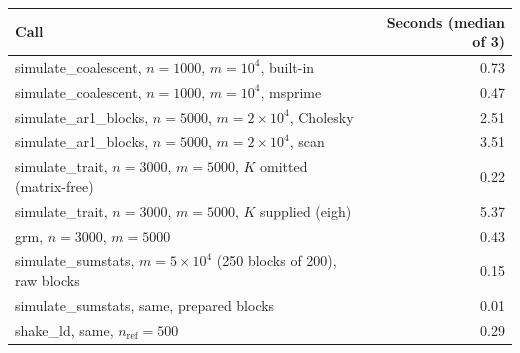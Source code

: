 \begin{tabular}{lr}
\toprule
Call & Seconds (median of 3) \\
\midrule
simulate\_coalescent, $n=1000$, $m=10^4$, built-in & 0.73 \\
simulate\_coalescent, $n=1000$, $m=10^4$, msprime & 0.47 \\
simulate\_ar1\_blocks, $n=5000$, $m=2\times10^4$, Cholesky & 2.51 \\
simulate\_ar1\_blocks, $n=5000$, $m=2\times10^4$, scan & 3.51 \\
simulate\_trait, $n=3000$, $m=5000$, $K$ omitted (matrix-free) & 0.22 \\
simulate\_trait, $n=3000$, $m=5000$, $K$ supplied (eigh) & 5.37 \\
grm, $n=3000$, $m=5000$ & 0.43 \\
simulate\_sumstats, $m=5\times10^4$ (250 blocks of 200), raw blocks & 0.15 \\
simulate\_sumstats, same, prepared blocks & 0.01 \\
shake\_ld, same, $n_{\mathrm{ref}}=500$ & 0.29 \\
\bottomrule
\end{tabular}
